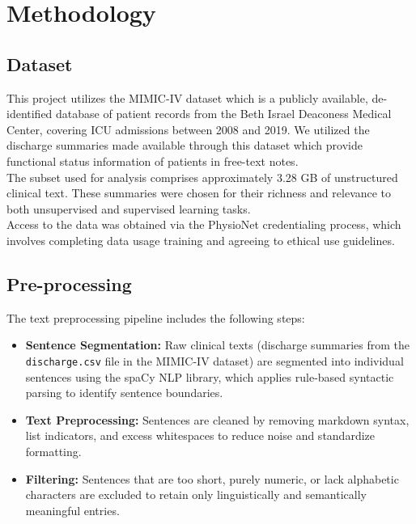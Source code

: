 
\chapter{Methodology}

\section{Dataset}
This project utilizes the MIMIC-IV dataset \cite{mimiciv} which is a publicly available, de-identified database of patient records from the Beth Israel Deaconess Medical Center, covering ICU admissions between 2008 and 2019. We utilized the discharge summaries made available through this dataset which provide functional status information of patients in free-text notes. \\

The subset used for analysis comprises approximately 3.28 GB of unstructured clinical text. These summaries were chosen for their richness and relevance to both unsupervised and supervised learning tasks.\\

Access to the data was obtained via the PhysioNet credentialing process, which involves completing data usage training and agreeing to ethical use guidelines. 


\section{Pre-processing}
The text preprocessing pipeline includes the following steps:

\begin{itemize}
    \item \textbf{Sentence Segmentation:} Raw clinical texts (discharge summaries from the \texttt{discharge.csv} file in the MIMIC-IV dataset) are segmented into individual sentences using the spaCy NLP library, which applies rule-based syntactic parsing to identify sentence boundaries.

    \item \textbf{Text Preprocessing:} Sentences are cleaned by removing markdown syntax, list indicators, and excess whitespaces to reduce noise and standardize formatting.

    \item \textbf{Filtering:} Sentences that are too short, purely numeric, or lack alphabetic characters are excluded to retain only linguistically and semantically meaningful entries.
\end{itemize}

